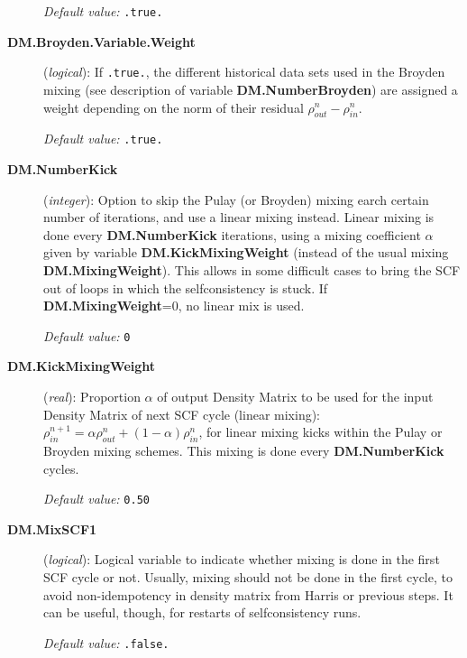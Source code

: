 \documentclass[11pt]{article}
\begin{document}
\begin{description}
{\it Default value:} {\tt .true.}

\item[{\bf DM.Broyden.Variable.Weight}] ({\it logical}):
If {\tt .true.}, the different historical data sets used in
the Broyden mixing (see description of variable {\bf
  DM.NumberBroyden}) are assigned a weight depending on the
norm of their residual ${\rho}^{n}_{out}-{\rho}^{n}_{in}$.

{\it Default value:} {\tt .true.}

\item[{\bf DM.NumberKick}] ({\it integer}):
Option to skip the Pulay (or Broyden) mixing earch certain number of iterations,
and use a linear mixing instead. Linear mixing is done
every {\bf DM.NumberKick} iterations, using a mixing coefficient
$\alpha$ given by variable {\bf DM.KickMixingWeight}
(instead of the usual mixing {\bf DM.MixingWeight}).
This allows in some difficult cases to bring the SCF out of
loops in which the selfconsistency is stuck.
If {\bf DM.MixingWeight}=0, no linear mix is used.

{\it Default value:} {\tt 0}

\item[{\bf DM.KickMixingWeight}] ({\it real}):
Proportion $\alpha$ of
output Density Matrix to be used for the input Density Matrix of
next SCF cycle (linear mixing):
$\rho^{n+1}_{in} = \alpha \rho^{n}_{out}
+(1 - \alpha) \rho^{n}_{in}$, for linear mixing kicks within the
Pulay or Broyden mixing schemes.
This mixing is done every {\bf DM.NumberKick} cycles.

{\it Default value:} {\tt 0.50}


\item[{\bf DM.MixSCF1}] ({\it logical}):
Logical variable to indicate whether mixing is done in the
first SCF cycle or not. Usually, mixing should not be done in
the first cycle, to avoid non-idempotency in density matrix
from Harris or previous steps. It can be useful, though,
for restarts of selfconsistency runs.

{\it Default value:} {\tt .false.}

\end{description}
\end{document}
